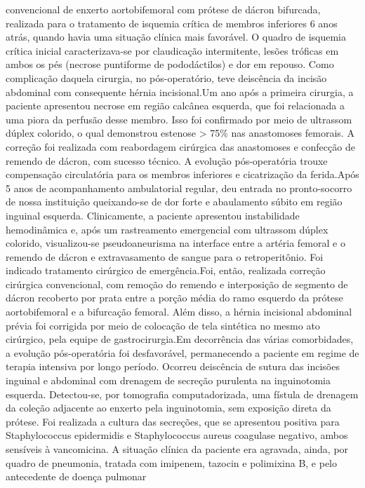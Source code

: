 \documentclass[numberinsection,times,10pt,spreadimages]{memoir}
\begin{document}
convencional de enxerto aortobifemoral com prótese de dácron bifurcada,
realizada
para o tratamento de isquemia crítica de membros inferiores 6 anos atrás, quando
havia uma situação clínica mais favorável. O quadro de isquemia crítica inicial
caracterizava-se por claudicação intermitente, lesões tróficas em ambos os pés
(necrose puntiforme de pododáctilos) e dor em repouso. Como complicação daquela
cirurgia, no pós-operatório, teve deiscência da incisão abdominal com
consequente
hérnia incisional.Um ano após a primeira cirurgia, a paciente apresentou necrose
em região calcânea
esquerda, que foi relacionada a uma piora da perfusão desse membro. Isso foi
confirmado por meio de ultrassom dúplex colorido, o qual demonstrou estenose >
75\% nas anastomoses femorais. A correção foi realizada com reabordagem
cirúrgica das
anastomoses e confecção de remendo de dácron, com sucesso técnico. A evolução
pós-operatória trouxe compensação circulatória para os membros inferiores e
cicatrização da ferida.Após 5 anos de acompanhamento ambulatorial regular, deu
entrada no pronto-socorro de
nossa instituição queixando-se de dor forte e abaulamento súbito em região
inguinal
esquerda. Clinicamente, a paciente apresentou instabilidade hemodinâmica e, após
um
rastreamento emergencial com ultrassom dúplex colorido, visualizou-se
pseudoaneurisma na interface entre a artéria femoral e o remendo de dácron e
extravasamento de sangue para o retroperitônio. Foi indicado tratamento
cirúrgico de
emergência.Foi, então, realizada correção cirúrgica convencional, com remoção do
remendo e
interposição de segmento de dácron recoberto por prata entre a porção média do
ramo
esquerdo da prótese aortobifemoral e a bifurcação femoral. Além disso, a hérnia
incisional abdominal prévia foi corrigida por meio de colocação de tela
sintética no
mesmo ato cirúrgico, pela equipe de gastrocirurgia.Em decorrência das várias
comorbidades, a evolução pós-operatória foi desfavorável,
permanecendo a paciente em regime de terapia intensiva por longo período.
Ocorreu
deiscência de sutura das incisões inguinal e abdominal com drenagem de secreção
purulenta na inguinotomia esquerda. Detectou-se, por tomografia computadorizada,
uma
fístula de drenagem da coleção adjacente ao enxerto pela inguinotomia, sem
exposição
direta da prótese. Foi realizada a cultura das secreções, que se apresentou
positiva
para Staphylococcus epidermidis e Staphylococcus
aureus coagulase negativo, ambos sensíveis à vancomicina. A situação
clínica da paciente era agravada, ainda, por quadro de pneumonia, tratada com
imipenem, tazocin e polimixina B, e pelo antecedente de doença pulmonar
\end{document}
